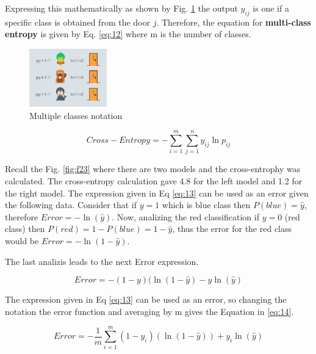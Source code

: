 \documentclass{article}
\begin{document}
Expressing this mathematically as shown by Fig. \ref{fig:f25} the output \(y_{ij}\) is one if a specific class is obtained from the door \(j\). Therefore, the equation for \textbf{multi-class entropy} is given by Eq. \eqref{eq:12} where m is the number of classes.

\begin{figure}[ht]
    \centering
    \includegraphics[width=0.3\textwidth,height=0.3\textheight,keepaspectratio]{images/multiple_notation.png}
    \captionsetup{justification=centering}
    \caption{Multiple classes notation}
    \label{fig:f25}
\end{figure}

\begin{equation}
\label{eq:12}
Cross-Entropy = - \sum_{i = 1}^m \sum_{j=1}^n y_{ij}  \ln{p_{ij}}
\end{equation} 

Recall the Fig. \ref{fig:f23} where there are two models and the cross-entrophy was calculated. The cross-entropy calculation gave 4.8 for the left model and 1.2 for the right model. The expression given in Eq \eqref{eq:13} can be used as an error given the following data. Consider that if \(y = 1\) which is blue class then \(P(blue) = \hat{y}\), therefore \(Error = -\ln{(\hat{y})}\). Now, analizing the red classification if \(y = 0\) (red class) then \(P(red) = 1 - P(blue) = 1 - \hat{y}\), thus the error for the red class would be \(Error = -\ln{(1 - \hat{y})}\).

The last analizis leads to the next Error expression.

\begin{equation}
\label{eq:13}
Error = -(1 - y)(\ln{(1 - \hat{y})} - y\ln{(\hat{y})}
\end{equation} 

The expression given in Eq \eqref{eq:13} can be used as an error, so changing the notation the error function and averaging by m gives the Equation in \eqref{eq:14}.

\begin{equation}
\label{eq:14}
Error = - \frac{1}{m} \sum_{i=1}^m (1 - y_i) (\ln{(1 - \hat{y})}) + y_i\ln{(\hat{y})}
\end{equation} 
\end{document}
